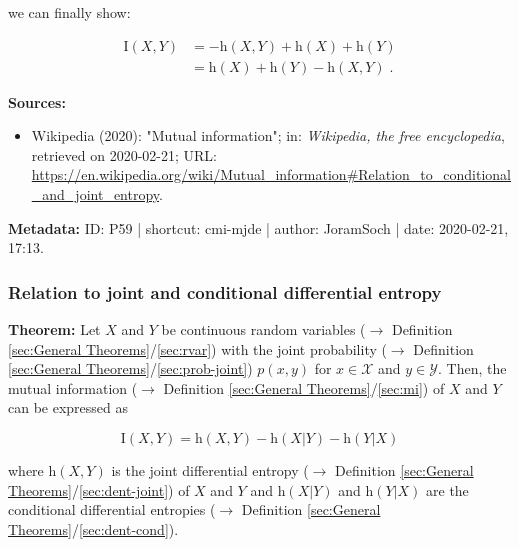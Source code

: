\documentclass[a4paper,12pt,twoside]{book}
\begin{document}
we can finally show:

\begin{equation} \label{eq:cmi-mjde-MI-qed}
\begin{split}
\mathrm{I}(X,Y) &= - \mathrm{h}(X,Y) + \mathrm{h}(X) + \mathrm{h}(Y) \\
&= \mathrm{h}(X) + \mathrm{h}(Y) - \mathrm{h}(X,Y) \; .
\end{split}
\end{equation}


\vspace{1em}
\textbf{Sources:}
\begin{itemize}
\item Wikipedia (2020): "Mutual information"; in: \textit{Wikipedia, the free encyclopedia}, retrieved on 2020-02-21; URL: \url{https://en.wikipedia.org/wiki/Mutual_information#Relation_to_conditional_and_joint_entropy}.
\end{itemize}


\vspace{1em}
\textbf{Metadata:} ID: P59 | shortcut: cmi-mjde | author: JoramSoch | date: 2020-02-21, 17:13.
\vspace{1em}



\subsubsection[\textbf{Relation to joint and conditional differential entropy}]{Relation to joint and conditional differential entropy} \label{sec:cmi-jcde}
\setcounter{equation}{0}

\textbf{Theorem:} Let $X$ and $Y$ be continuous random variables ($\rightarrow$ Definition \ref{sec:General Theorems}/\ref{sec:rvar}) with the joint probability ($\rightarrow$ Definition \ref{sec:General Theorems}/\ref{sec:prob-joint}) $p(x,y)$ for $x \in \mathcal{X}$ and $y \in \mathcal{Y}$. Then, the mutual information ($\rightarrow$ Definition \ref{sec:General Theorems}/\ref{sec:mi}) of $X$ and $Y$ can be expressed as

\begin{equation} \label{eq:cmi-jcde-dmi-jce}
\mathrm{I}(X,Y) = \mathrm{h}(X,Y) - \mathrm{h}(X|Y) - \mathrm{h}(Y|X)
\end{equation}

where $\mathrm{h}(X,Y)$ is the joint differential entropy ($\rightarrow$ Definition \ref{sec:General Theorems}/\ref{sec:dent-joint}) of $X$ and $Y$ and $\mathrm{h}(X \vert Y)$ and $\mathrm{h}(Y \vert X)$ are the conditional differential entropies ($\rightarrow$ Definition \ref{sec:General Theorems}/\ref{sec:dent-cond}).
\end{document}
